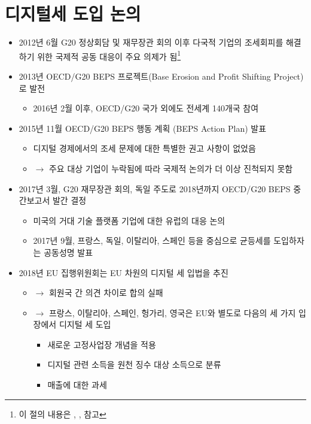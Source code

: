 \section{디지털세 도입 논의}\label{sec:}
\begin{itemize}
\item 2012년 6월 G20 정상회담 및 재무장관 회의 이후 다국적 기업의 조세회피를 해결하기 위한 국제적 공동 대응이 주요 의제가 됨\footnote{이 절의 내용은 \cite{gimbichmalo-igyeong-geun:2019aa}, \cite{OECD/G20-Base-Erosion-and-Profit-Shifting-Project:2021uo}, \cite{yesangjun-otaehyeon:2021aa} 참고}
\item 2013년 OECD/G20 BEPS 프로젝트(Base Erosion and Profit Shifting Project)로 발전
	\begin{itemize}
	\item 2016년 2월 이후, OECD/G20 국가 외에도 전세계 140개국 참여
	\end{itemize} 
\item 2015년 11월 OECD/G20 BEPS 행동 계획 (BEPS Action Plan) 발표
	\begin{itemize}
	\item 디지털 경제에서의 조세 문제에 대한 특별한 권고 사항이 없었음
	\item $\rightarrow$ 주요 대상 기업이 누락됨에 따라 국제적 논의가 더 이상 진척되지 못함
	\end{itemize}
\item 2017년 3월, G20 재무장관 회의, 독일 주도로 	2018년까지 OECD/G20 BEPS 중간보고서 발간 결정
	\begin{itemize}
	\item 미국의 거대 기술 플랫폼 기업에 대한 유럽의 대응 논의
	\item 2017년 9월, 프랑스, 독일, 이탈리아, 스페인 등을 중심으로 균등세를 도입하자는 공동성명 발표
	\end{itemize}
\item 2018년 EU 집행위원회는 EU 차원의 디지털 세 입법을 추진
	\begin{itemize}
	\item $\rightarrow$ 회원국 간 의견 차이로 합의 실패	
	\item $\rightarrow$ 프랑스, 이탈리아, 스페인, 헝가리, 영국은 EU와 별도로 다음의 세 가지 입장에서 디지털 세 도입
		\begin{itemize}
		\item 새로운 고정사업장 개념을 적용
		\item 디지털 관련 소득을 원천 징수 대상 소득으로 분류
		\item 매출에 대한 과세
		\end{itemize}

\end{itemize}
\end{itemize}
